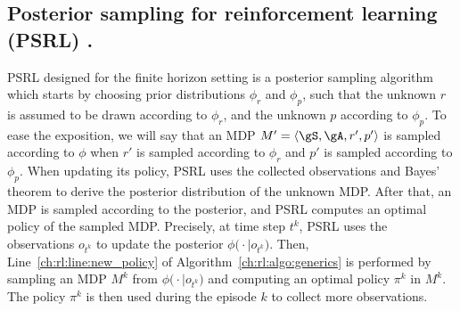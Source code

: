 \subsection{Posterior sampling for reinforcement learning (PSRL) \texorpdfstring{\cite{osband2013more}}{[ORV13]}.}

PSRL designed for the finite horizon setting is a posterior sampling algorithm which starts by choosing prior distributions $\phi_r$ and $\phi_p$, such that the unknown $r$ is assumed to be drawn according to $\phi_r$, and the unknown $p$ according to $\phi_p$.
To ease the exposition, we will say that an MDP $M'=\langle\gS,\gA,r',p'\rangle$ is sampled according to $\phi$ when $r'$ is sampled according to $\phi_r$ and $p'$ is sampled according to $\phi_p$.
When updating its policy, PSRL uses the collected observations and Bayes' theorem to derive the posterior distribution of the unknown MDP.
After that, an MDP is sampled according to the posterior, and PSRL computes an optimal policy of the sampled MDP.
Precisely, at time step $t^k$, PSRL uses the observations $o_{t^k}$ to update the posterior $\phi\bigl(\cdot\mid o_{t^k}\bigr)$.
Then, Line~\ref{ch:rl:line:new_policy} of Algorithm~\ref{ch:rl:algo:generics} is performed by sampling an MDP $M^k$ from $\phi\bigl(\cdot\mid o_{t^k}\bigr)$ and computing an optimal policy $\pi^k$ in $M^k$.
The policy $\pi^k$ is then used during the episode $k$ to collect more observations.

